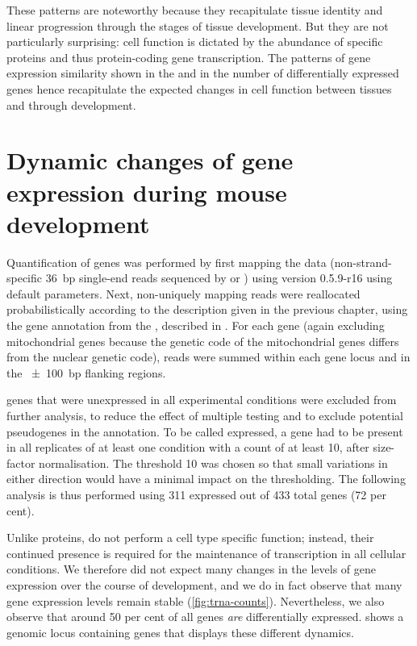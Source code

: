 These patterns are noteworthy because they recapitulate tissue identity and
linear progression through the stages of tissue development. But they are not
particularly surprising: cell function is dictated by the abundance of specific
proteins and thus protein-coding gene transcription. The patterns of gene
expression similarity shown in the \pca and in the number of differentially
expressed genes hence recapitulate the expected changes in cell function between
tissues and through development.

\section{Dynamic changes of  gene expression during mouse
development}

Quantification of \trna genes was performed by first mapping the  \chipseq
data (non-strand-specific \SI{36}{bp} single-end reads sequenced by
  or ) using
 version 0.5.9-r16 \citep{Li:2009a} using default parameters.
Next, non-uniquely mapping reads were reallocated probabilistically according to
the description given in the previous chapter, using the \trna gene annotation
from the , described in \citet{Chan:2009}. For each
\trna gene (again excluding mitochondrial \trna genes because the genetic code
of the mitochondrial \mrna genes differs from the nuclear genetic code), reads
were summed within each \trna gene locus and in the \SI{\pm100}{bp} flanking
regions.

\trna genes that were unexpressed in all experimental conditions were excluded
from further analysis, to reduce the effect of multiple testing
\citep{Bourgon:2010} and to exclude potential pseudogenes in the annotation. To
be called expressed, a \trna gene had to be present in all replicates of at
least one condition with a count of at least \num{10}, after size-factor
normalisation. The threshold \num{10} was chosen so that small variations in
either direction would have a minimal impact on the thresholding. The following
analysis is thus performed using \num{311} expressed out of \num{433} total
\trna genes (\num{72} per cent).

Unlike proteins, \trna[s] do not perform a cell type specific function; instead,
their continued presence is required for the maintenance of transcription in all
cellular conditions. We therefore did not expect many changes in the levels of
\trna gene expression over the course of development, and we do in fact observe
that many \trna gene expression levels remain stable (\cref{fig:trna-counts}).
Nevertheless, we also observe that around \num{50} per cent of all \trna genes
\emph{are} differentially expressed. 
shows a genomic locus containing \trna genes that displays these different
dynamics.


